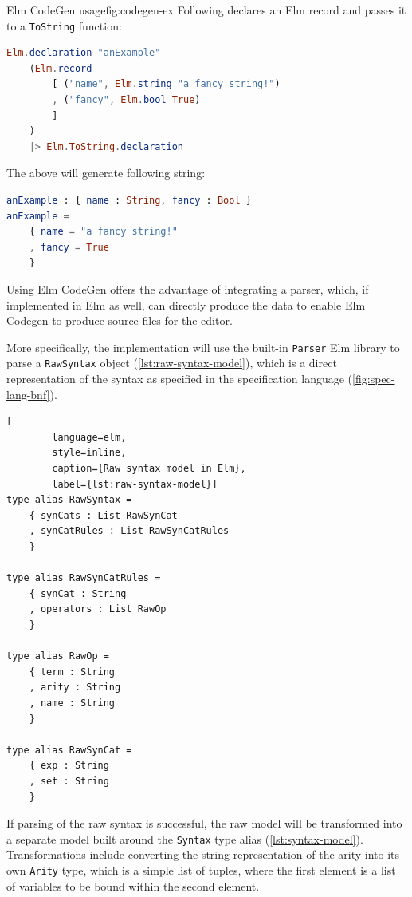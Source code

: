 \begin{myfigure}{Elm CodeGen usage}{fig:codegen-ex}
  Following declares an Elm record and passes it to a \texttt{ToString} function:

  \begin{lstlisting}[backgroundcolor=\color{myfigurecolorback},language=elm]
Elm.declaration "anExample"
    (Elm.record
        [ ("name", Elm.string "a fancy string!")
        , ("fancy", Elm.bool True)
        ]
    )
    |> Elm.ToString.declaration
\end{lstlisting}

  The above will generate following string:
  \begin{lstlisting}[backgroundcolor=\color{myfigurecolorback},language=elm]
anExample : { name : String, fancy : Bool }
anExample =
    { name = "a fancy string!"
    , fancy = True
    }
\end{lstlisting}
\end{myfigure}

Using Elm CodeGen offers the advantage of integrating a parser, which,
if implemented in Elm as well, can directly produce the data to enable
Elm Codegen to produce source files for the editor.

More specifically, the implementation will use the built-in \texttt{Parser} Elm
library to parse a \texttt{RawSyntax} object (\cref{lst:raw-syntax-model}),
which is a direct representation of the syntax as specified in the specification
language (\cref{fig:spec-lang-bnf}).

\begin{lstlisting}[
        language=elm,
        style=inline,
        caption={Raw syntax model in Elm},
        label={lst:raw-syntax-model}]
type alias RawSyntax =
    { synCats : List RawSynCat
    , synCatRules : List RawSynCatRules
    }

type alias RawSynCatRules =
    { synCat : String
    , operators : List RawOp
    }

type alias RawOp =
    { term : String
    , arity : String
    , name : String
    }

type alias RawSynCat =
    { exp : String
    , set : String
    }
\end{lstlisting}

If parsing of the raw syntax is successful, the raw model will
be transformed into a separate model built around the \texttt{Syntax}
type alias (\cref{lst:syntax-model}).
Transformations include converting the string-representation of the arity
into its own \texttt{Arity} type, which is a simple list of tuples,
where the first element is a list of variables to be bound within the second element.

